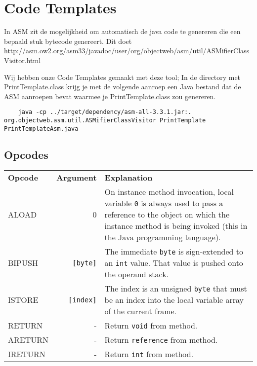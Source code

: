 \section{Code Templates}
In ASM zit de mogelijkheid om automatisch de java code te genereren die een bepaald stuk bytecode genereert.
Dit doet http://asm.ow2.org/asm33/javadoc/user/org/objectweb/asm/util/ASMifierClassVisitor.html

Wij hebben onze Code Templates gemaakt met deze tool; In de directory met PrintTemplate.class krijg je met de volgende aanroep een Java bestand dat de ASM aanroepen bevat waarmee je PrintTemplate.class zou genereren.
\begin{verbatim}
	java -cp ../target/dependency/asm-all-3.3.1.jar:. org.objectweb.asm.util.ASMifierClassVisitor PrintTemplate PrintTemplateAsm.java
\end{verbatim}

\subsection{Opcodes}
\begin{tabular*}{0.75 \textwidth}{|l| r | p{8cm} |}
	\hline
	\textbf{Opcode}	&	\textbf{Argument}	& \textbf{Explanation}	\\
	ALOAD		&	0			& On instance method invocation, local variable \verb+0+ is always used to pass a reference to the object on which the instance method is being invoked (this in the Java programming language).	\\
	BIPUSH		&	\verb+[byte]+			& The immediate \verb+byte+ is sign-extended to an \verb+int+ value. That value is pushed onto the operand stack. \\
	ISTORE		&	\verb+[index]+			& The index is an unsigned \verb+byte+ that must be an index into the local variable array of the current frame. \\
	RETURN		&	-			& Return \verb+void+ from method. \\
	ARETURN		&	-			& Return \verb+reference+ from method. \\
	IRETURN		&	-			& Return \verb+int+ from method. \\
\end{tabular*}
